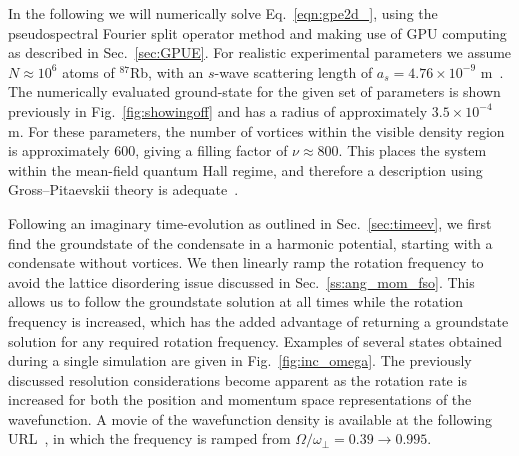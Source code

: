 In the following we will numerically solve Eq.~\eqref{eqn:gpe2d_}, using the pseudospectral Fourier split operator method and making use of GPU computing as described in Sec.~\ref{sec:GPUE}. For realistic experimental parameters we assume  $N\approx 10^6$ atoms of $^{87}$Rb, with an $s$-wave scattering length of $a_s=4.76\times10^{-9}$ m~\cite{AO:Roberts_prl_1998}. The numerically evaluated ground-state for the given set of parameters is shown previously in Fig.~\ref{fig:showingoff} and has a radius of approximately $3.5\times 10^{-4}$ m. For these parameters, the number of vortices within the visible density region is approximately 600, giving a filling factor of $\nu \approx 800 $. This places the system within the mean-field quantum Hall regime, and therefore a description using Gross--Pitaevskii theory is adequate~\cite{Vtx:Schweikhard_prl_2004}.

Following an imaginary time-evolution as outlined in Sec.~\ref{sec:timeev}, we first find the groundstate of the condensate in a harmonic potential, starting with a condensate without vortices. We then linearly ramp the rotation frequency to avoid the lattice disordering issue discussed in Sec.~\ref{ss:ang_mom_fso}. This allows us to follow the groundstate solution at all times while the rotation frequency is increased, which has the added advantage of returning a groundstate solution for any required rotation frequency. Examples of several states obtained during a single simulation are given in Fig.~\ref{fig:inc_omega}. The previously discussed resolution considerations become apparent as the rotation rate is increased for both the position and momentum space representations of the wavefunction. A movie of the wavefunction density is available at the following URL~\cite{YT:BEC_gen}, in which the frequency is ramped from $\Omega/\omega_\perp = 0.39 \to 0.995$.

